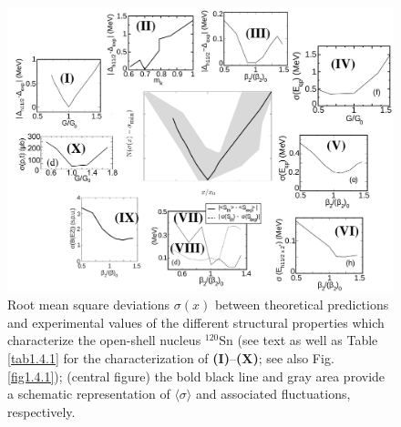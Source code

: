 \begin{figure}
\begin{center}
\centerline{\includegraphics[width=15cm]{introduccion/figs/funnel_norm_tot_try_v3.pdf}}
\caption[Root mean square deviations $\sigma(x)$ between theoretical predictions and experimental values of the different structural properties which  characterize the open-shell nucleus $^{120}$Sn.]{ Root mean square deviations $\sigma(x)$ between theoretical predictions and experimental values of the different structural properties which  characterize the open-shell nucleus $^{120}$Sn (see text as well as Table \ref{tab1.4.1} for the characterization of \textbf{(I)}--\textbf{(X)}; see also Fig. \ref{fig1.4.1}); (central figure) the bold black line and gray area provide a schematic representation of $\langle\sigma\rangle$ and associated fluctuations, respectively.}\label{fig1.4.1x}
\end{center}
\end{figure}
